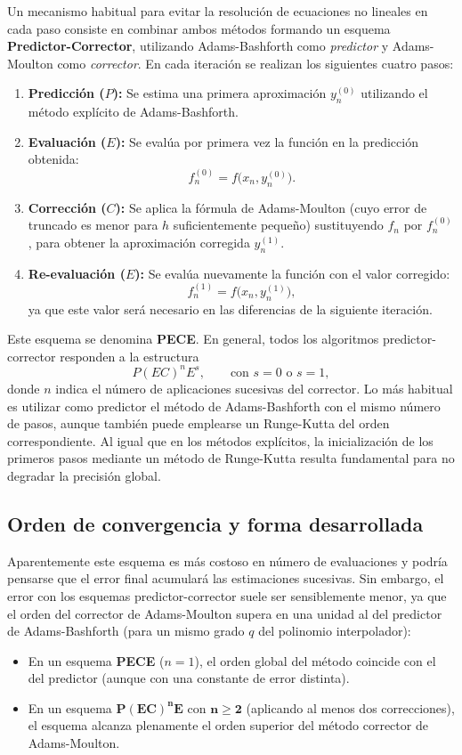Un mecanismo habitual para evitar la resolución de ecuaciones no lineales en cada paso consiste en combinar ambos métodos formando un esquema \textbf{Predictor-Corrector}, utilizando Adams-Bashforth como \emph{predictor} y Adams-Moulton como \emph{corrector}. En cada iteración se realizan los siguientes cuatro pasos:
\begin{enumerate}
    \item \textbf{Predicción ($P$):} Se estima una primera aproximación $y_n^{(0)}$ utilizando el método explícito de Adams-Bashforth.
    \item \textbf{Evaluación ($E$):} Se evalúa por primera vez la función en la predicción obtenida:
    \[
        f_n^{(0)} = f\bigl(x_n, y_n^{(0)}\bigr).
    \]
    \item \textbf{Corrección ($C$):} Se aplica la fórmula de Adams-Moulton (cuyo error de truncado es menor para $h$ suficientemente pequeño) sustituyendo $f_n$ por $f_n^{(0)}$, para obtener la aproximación corregida $y_n^{(1)}$.
    \item \textbf{Re-evaluación ($E$):} Se evalúa nuevamente la función con el valor corregido:
    \[
        f_n^{(1)} = f\bigl(x_n, y_n^{(1)}\bigr),
    \]
    ya que este valor será necesario en las diferencias de la siguiente iteración.
\end{enumerate}

Este esquema se denomina \textbf{PECE}. En general, todos los algoritmos predictor-corrector responden a la estructura
\[
    P(EC)^n E^s, \qquad \text{con } s = 0 \text{ o } s = 1,
\]
donde $n$ indica el número de aplicaciones sucesivas del corrector. Lo más habitual es utilizar como predictor el método de Adams-Bashforth con el mismo número de pasos, aunque también puede emplearse un Runge-Kutta del orden correspondiente. Al igual que en los métodos explícitos, la inicialización de los primeros pasos mediante un método de Runge-Kutta resulta fundamental para no degradar la precisión global.

\subsection*{Orden de convergencia y forma desarrollada}

Aparentemente este esquema es más costoso en número de evaluaciones y podría pensarse que el error final acumulará las estimaciones sucesivas. Sin embargo, el error con los esquemas predictor-corrector suele ser sensiblemente menor, ya que el orden del corrector de Adams-Moulton supera en una unidad al del predictor de Adams-Bashforth (para un mismo grado $q$ del polinomio interpolador):
\begin{itemize}
    \item En un esquema \textbf{PECE} ($n=1$), el orden global del método coincide con el del predictor (aunque con una constante de error distinta).
    \item En un esquema $\mathbf{P(EC)^n E}$ con $\mathbf{n \ge 2}$ (aplicando al menos dos correcciones), el esquema alcanza plenamente el orden superior del método corrector de Adams-Moulton.
\end{itemize}

